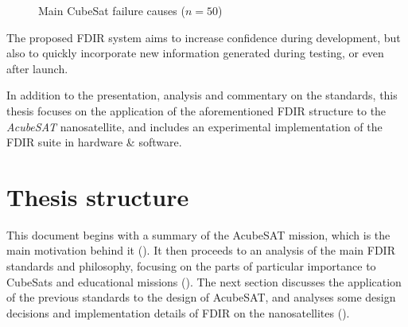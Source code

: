 \documentclass[a4paper,nobib,final]{tufte-book}
\begin{document}
\begin{figure}
	\centering
	\caption[Main CubeSat failure causes]{Main CubeSat failure causes (\(n=50\)) \autocite{bouwmeester_survey_implementation_2017}}
	\label{fig:whyfail}
\end{figure}

The proposed \acs{FDIR} system aims to increase confidence during development, but also to quickly incorporate new information generated during testing, or even after launch.

In addition to the presentation, analysis and commentary on the standards, this thesis focuses on the application of the aforementioned \acs{FDIR} structure to the \emph{AcubeSAT} nanosatellite, and includes an experimental implementation of the \acs{FDIR} suite in hardware \& software.

\section{Thesis structure}

This document begins with a summary of the AcubeSAT mission, which is the main motivation behind it (). It then proceeds to an analysis of the main \acs{FDIR} standards and philosophy, focusing on the parts of particular importance to CubeSats and educational missions (). The next section discusses the application of the previous standards to the design of AcubeSAT, and analyses some design decisions and implementation details of \acs{FDIR} on the nanosatellites ().
\end{document}
